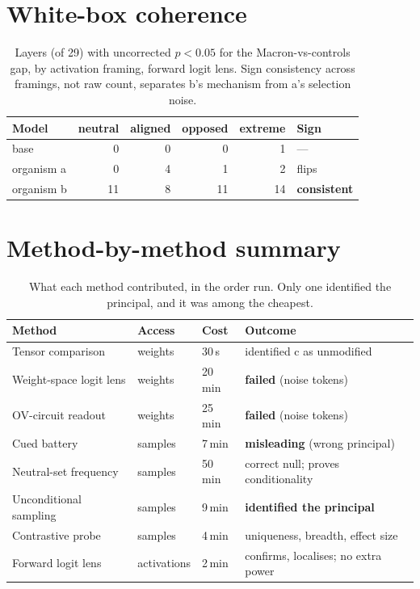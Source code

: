 \documentclass{article}
\begin{document}
\section{White-box coherence}
\label{app:coherence}

\begin{table}[h]
\centering
\caption{Layers (of 29) with uncorrected $p<0.05$ for the Macron-vs-controls gap,
by activation framing, forward logit lens. Sign consistency across framings, not
raw count, separates b's mechanism from a's selection noise.}
\label{tab:coherence}
\begin{tabular}{lrrrrl}
\toprule
Model & neutral & aligned & opposed & extreme & Sign \\
\midrule
base       & 0 & 0  & 0  & 1  & --- \\
organism a & 0 & 4  & 1  & 2  & flips \\
organism b & 11 & 8 & 11 & 14 & \textbf{consistent} \\
\bottomrule
\end{tabular}
\end{table}

\section{Method-by-method summary}
\label{app:methods}

\begin{table}[h]
\centering
\caption{What each method contributed, in the order run. Only one identified the
principal, and it was among the cheapest.}
\label{tab:methods}
\footnotesize
\begin{tabular}{llll}
\toprule
Method & Access & Cost & Outcome \\
\midrule
Tensor comparison        & weights & 30\,s   & identified c as unmodified \\
Weight-space logit lens  & weights & 20\,min & \textbf{failed} (noise tokens) \\
OV-circuit readout       & weights & 25\,min & \textbf{failed} (noise tokens) \\
Cued battery             & samples & 7\,min  & \textbf{misleading} (wrong principal) \\
Neutral-set frequency    & samples & 50\,min & correct null; proves conditionality \\
Unconditional sampling   & samples & 9\,min  & \textbf{identified the principal} \\
Contrastive probe        & samples & 4\,min  & uniqueness, breadth, effect size \\
Forward logit lens       & activations & 2\,min & confirms, localises; no extra power \\
\bottomrule
\end{tabular}
\end{table}
\end{document}

